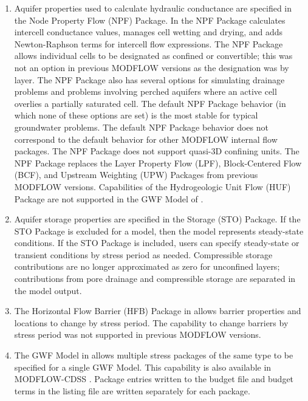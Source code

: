 \begin{enumerate}
\item Aquifer properties used to calculate hydraulic conductance are specified in the Node Property Flow (NPF) Package.  In \mfcomma the NPF Package calculates intercell conductance values, manages cell wetting and drying, and adds Newton-Raphson terms for intercell flow expressions.  The NPF Package allows individual cells to be designated as confined or convertible; this was not an option in previous MODFLOW versions as the designation was by layer.  The NPF Package also has several options for simulating drainage problems and problems involving perched aquifers where an active cell overlies a partially saturated cell.  The default NPF Package behavior (in which none of these options are set) is the most stable for typical groundwater problems.  The default NPF Package behavior does not correspond to the default behavior for other MODFLOW internal flow packages.  The NPF Package does not support quasi-3D confining units.  The NPF Package replaces the Layer Property Flow (LPF), Block-Centered Flow (BCF), and Upstream Weighting (UPW) Packages from previous MODFLOW versions.  Capabilities of the Hydrogeologic Unit Flow (HUF) Package \citep{anderman2000modflow, anderman2003modflow} are not supported in the GWF Model of \mf.

\item Aquifer storage properties are specified in the Storage (STO) Package.  If the STO Package is excluded for a model, then the model represents steady-state conditions.  If the STO Package is included, users can specify steady-state or transient conditions by stress period as needed.  Compressible storage contributions are no longer approximated as zero for unconfined layers; contributions from pore drainage and compressible storage are separated in the model output.

\item The Horizontal Flow Barrier (HFB) Package \citep{hsieh1993hfb, modflow2005} in \mf allows barrier properties and locations to change by stress period.  The capability to change barriers by stress period was not supported in previous MODFLOW versions.

\item The GWF Model in \mf allows multiple stress packages of the same type to be specified for a single GWF Model.  This capability is also available in MODFLOW-CDSS \citep{banta2011modflow}.  Package entries written to the budget file and budget terms in the listing file are written separately for each package.


\end{enumerate}
